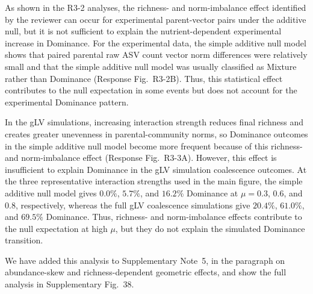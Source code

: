 
\responselabel
As shown in the R3-2 analyses, the richness- and norm-imbalance effect identified by the reviewer can occur for experimental parent-vector pairs under the additive null, but it is not sufficient to explain the nutrient-dependent experimental increase in Dominance. For the experimental data, the simple additive null model shows that paired parental raw ASV count vector norm differences were relatively small and that the simple additive null model was usually classified as Mixture rather than Dominance (Response Fig.~R3-2B). Thus, this statistical effect contributes to the null expectation in some events but does not account for the experimental Dominance pattern.

In the gLV simulations, increasing interaction strength reduces final richness and creates greater unevenness in parental-community norms, so Dominance outcomes in the simple additive null model become more frequent because of this richness- and norm-imbalance effect (Response Fig.~R3-3A). However, this effect is insufficient to explain Dominance in the gLV simulation coalescence outcomes. At the three representative interaction strengths used in the main figure, the simple additive null model gives $0.0\%$, $5.7\%$, and $16.2\%$ Dominance at $\mu = 0.3$, $0.6$, and $0.8$, respectively, whereas the full gLV coalescence simulations give $20.4\%$, $61.0\%$, and $69.5\%$ Dominance. Thus, richness- and norm-imbalance effects contribute to the null expectation at high $\mu$, but they do not explain the simulated Dominance transition.

We have added this analysis to Supplementary Note~5, in the paragraph on abundance-skew and richness-dependent geometric effects, and show the full analysis in Supplementary Fig.~38.

